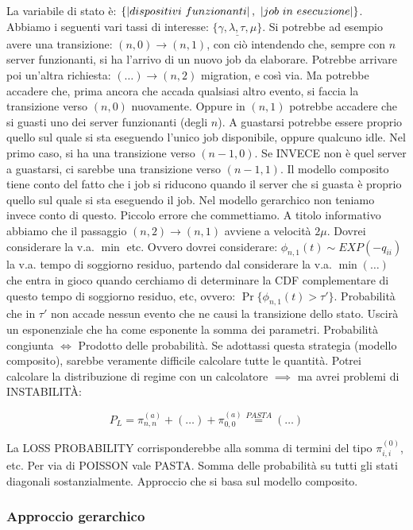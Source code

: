 La variabile di stato è: $\{\cardinality{dispositivi\ funzionanti},\ \cardinality{job\ in\ esecuzione}\}$. Abbiamo i seguenti vari tassi di interesse: $\underline{\{\gamma,\lambda,\tau,\mu\}}$. Si potrebbe ad esempio avere una transizione: $(n,0)\rightarrow(n,1)$, con ciò intendendo che, sempre con $n$ server funzionanti, si ha l'arrivo di un nuovo job da elaborare. Potrebbe arrivare poi un'altra richiesta: $(\dots)\rightarrow(n,2)$ migration, e così via. Ma potrebbe accadere che, prima ancora che accada qualsiasi altro evento, si faccia la transizione verso $(n,0)$ nuovamente. Oppure in $(n,1)$ potrebbe accadere che si guasti uno dei server funzionanti (degli $n$). A guastarsi potrebbe essere proprio quello sul quale si sta eseguendo l'unico job disponibile, oppure qualcuno idle. Nel primo caso, si ha una transizione verso $(n-1,0)$. Se INVECE non è quel server a guastarsi, ci sarebbe una transizione verso $(n-1,1)$. Il modello composito tiene conto del fatto che i job si riducono quando il server che si guasta è proprio quello sul quale si sta eseguendo il job. Nel modello gerarchico non teniamo invece conto di questo. Piccolo errore che commettiamo. A titolo informativo abbiamo che il passaggio $(n,2)\rightarrow(n,1)$ avviene a velocità $2\mu$. Dovrei considerare la v.a. $\min$ etc. Ovvero dovrei considerare: $\phi_{n,1}(t) \sim EXP(-q_{ii})$ la v.a. tempo di soggiorno residuo, partendo dal considerare la v.a. $\min(\dots)$ che entra in gioco quando cerchiamo di determinare la CDF complementare di questo tempo di soggiorno residuo, etc, ovvero: $\Pr\{\phi_{n,1}(t) > \tau'\}$. Probabilità che in $\tau'$ non accade nessun evento che ne causi la transizione dello stato. Uscirà un esponenziale che ha come esponente la somma dei parametri. Probabilità congiunta $\iff$ Prodotto delle probabilità. Se adottassi questa strategia (modello composito), sarebbe veramente difficile calcolare tutte le quantità. Potrei calcolare la distribuzione di regime con un calcolatore $\implies$ ma avrei problemi di INSTABILIT\`A:

\[
	P_L = \pi_{n,n}^{(a)} + (\dots) + \pi_{0,0}^{(a)} \stackrel{PASTA}{=} (\dots)
\]

La LOSS PROBABILITY corrisponderebbe alla somma di termini del tipo $\pi_{i,i}^{(0)}$, etc. Per via di POISSON vale PASTA. Somma delle probabilità su tutti gli stati diagonali sostanzialmente. Approccio che si basa sul modello composito.


\subsubsection{Approccio gerarchico}

